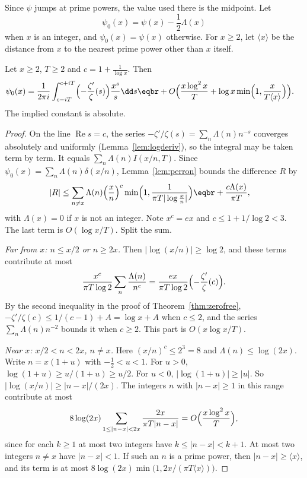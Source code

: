 Since $\psi$ jumps at prime powers, the value used there is the midpoint. Let
\[
\psi_0(x)=\psi(x)-\frac12\Lambda(x)
\]
when $x$ is an integer, and $\psi_0(x)=\psi(x)$ otherwise. For $x\ge2$, let $\langle x\rangle$ be the distance from $x$ to the nearest prime power other than $x$ itself.

\begin{proposition}\label{prop:truncperron}
Let $x\ge2$, $T\ge2$ and $c=1+\frac1{\log x}$. Then
\[
\begin{aligned}\psi_0(x)&=\frac1{2\pi i}\int_{c-iT}^{c+iT}\Bigl(-\frac{\zeta'}\zeta(s)\Bigr)\frac{x^s}s\dd s\eqbr+O\Bigl(\frac{x\log^2x}T+\log x\min\Bigl(1,\frac x{T\langle x\rangle}\Bigr)\Bigr).\end{aligned}
\]
The implied constant is absolute.
\end{proposition}
\begin{proof}
On the line $\operatorname{Re}s=c$, the series $-\zeta'/\zeta(s)=\sum_n\Lambda(n)n^{-s}$ converges absolutely and uniformly (Lemma~\ref{lem:logderiv}), so the integral may be taken term by term. It equals $\sum_n\Lambda(n)I(x/n,T)$. Since $\psi_0(x)=\sum_n\Lambda(n)\delta(x/n)$, Lemma~\ref{lem:perron} bounds the difference $R$ by
\[
\begin{aligned}|R|&\le\sum_{n\ne x}\Lambda(n)\Bigl(\frac xn\Bigr)^c\min\Bigl(1,\frac1{\pi T|\log\frac xn|}\Bigr)\eqbr+\frac{c\Lambda(x)}{\pi T},\end{aligned}
\]
with $\Lambda(x)=0$ if $x$ is not an integer. Note $x^c=ex$ and $c\le1+1/\log2<3$. The last term is $O(\log x/T)$. Split the sum.

\emph{Far from $x$: $n\le x/2$ or $n\ge2x$.} Then $|\log(x/n)|\ge\log2$, and these terms contribute at most
\[
\frac{x^c}{\pi T\log2}\sum_n\frac{\Lambda(n)}{n^c}=\frac{ex}{\pi T\log2}\Bigl(-\frac{\zeta'}\zeta(c)\Bigr).
\]
By the second inequality in the proof of Theorem~\ref{thm:zerofree}, $-\zeta'/\zeta(c)\le1/(c-1)+A=\log x+A$ when $c\le2$, and the series $\sum_n\Lambda(n)n^{-2}$ bounds it when $c\ge2$. This part is $O(x\log x/T)$.

\emph{Near $x$: $x/2<n<2x$, $n\ne x$.} Here $(x/n)^c\le2^3=8$ and $\Lambda(n)\le\log(2x)$. Write $n=x(1+u)$ with $-\frac12<u<1$. For $u>0$, $\log(1+u)\ge u/(1+u)\ge u/2$. For $u<0$, $|\log(1+u)|\ge|u|$. So $|\log(x/n)|\ge|n-x|/(2x)$. The integers $n$ with $|n-x|\ge1$ in this range contribute at most
\[
8\log(2x)\sum_{1\le|n-x|<2x}\frac{2x}{\pi T|n-x|}=O\Bigl(\frac{x\log^2x}T\Bigr),
\]
since for each $k\ge1$ at most two integers have $k\le|n-x|<k+1$. At most two integers $n\ne x$ have $|n-x|<1$. If such an $n$ is a prime power, then $|n-x|\ge\langle x\rangle$, and its term is at most $8\log(2x)\min\bigl(1,2x/(\pi T\langle x\rangle)\bigr)$.
\end{proof}

